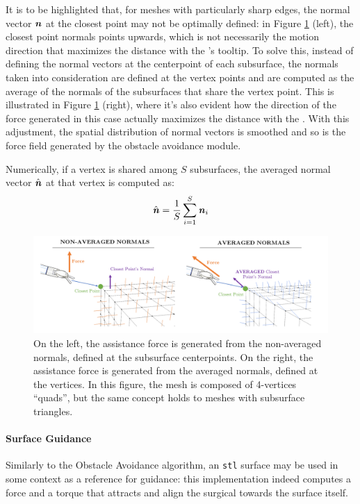 \documentclass[../main.tex]{subfiles}
\begin{document}
It is to be highlighted that, for meshes with particularly sharp edges, the normal vector $\textbf{\textit{n}}$ at the closest point may not be optimally defined: in Figure \ref{fig:normalsaveraging} (left), the closest point normals points upwards, which is not necessarily the motion direction that maximizes the distance with the \psm's tooltip. To solve this, instead of defining the normal vectors at the centerpoint of each subsurface, the normals taken into consideration are defined at the vertex points and are computed as the average of the normals of the subsurfaces that share the vertex point. This is illustrated in Figure \ref{fig:normalsaveraging} (right), where it's also evident how the direction of the force generated in this case actually maximizes the distance with the \ee. With this adjustment, the spatial distribution of normal vectors is smoothed and so is the force field generated by the obstacle avoidance module.

Numerically, if a vertex is shared among $S$ subsurfaces, the averaged normal vector $\hat{\textbf{\textit{n}}}$ at that vertex is computed as:
\begin{equation}
    \hat{\textbf{\textit{n}}} = \frac{1}{S}\sum_{i=1}^{S} \textbf{\textit{n}}_i
    \label{eq:normalsaveraging}
\end{equation}


\begin{figure}
    \centering
    \includegraphics[width=\textwidth]{images/normals_averaging.png}
    \caption{On the left, the assistance force is generated from the non-averaged normals, defined at the subsurface centerpoints. On the right, the assistance force is generated from the averaged normals, defined at the vertices. In this figure, the mesh is composed of 4-vertices ``quads'', but the same concept holds to meshes with subsurface triangles.}
    \label{fig:normalsaveraging}
\end{figure}

\paragraph{Surface Guidance} Similarly to the Obstacle Avoidance algorithm, an \texttt{stl} surface may be used in some context as a reference for guidance: this implementation indeed computes a force and a torque that attracts and align the surgical \ee towards the surface itself. 
\end{document}

